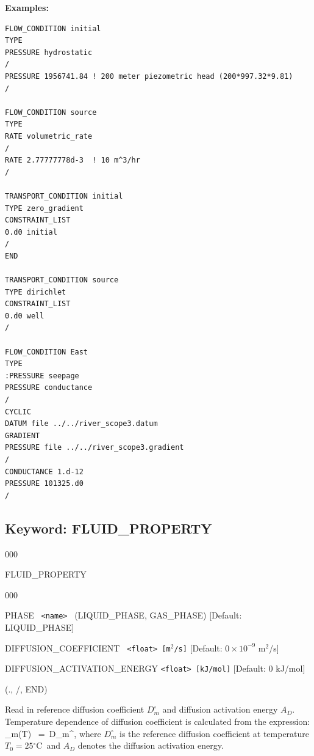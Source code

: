 \documentclass[12pt]{article}
\def\EQ#1\EN{\begin{equation}#1\end{equation}}
\newcommand{\degc}{$^\circ$C}
\newcommand{\eq}{\ =\ }
\begin{document}
\bigskip

{\noindent\bf Examples:}
\begin{verbatim}
FLOW_CONDITION initial
TYPE
PRESSURE hydrostatic
/
PRESSURE 1956741.84 ! 200 meter piezometric head (200*997.32*9.81)
/

FLOW_CONDITION source
TYPE
RATE volumetric_rate
/
RATE 2.77777778d-3  ! 10 m^3/hr
/

TRANSPORT_CONDITION initial
TYPE zero_gradient
CONSTRAINT_LIST
0.d0 initial
/
END

TRANSPORT_CONDITION source
TYPE dirichlet
CONSTRAINT_LIST
0.d0 well
/

FLOW_CONDITION East
TYPE
:PRESSURE seepage
PRESSURE conductance
/
CYCLIC
DATUM file ../../river_scope3.datum
GRADIENT
PRESSURE file ../../river_scope3.gradient
/
CONDUCTANCE 1.d-12
PRESSURE 101325.d0
/
\end{verbatim}


\newpage
\protect\hypertarget{target_fluid_property}{}

\subsection{Keyword: FLUID\_PROPERTY}


\begin{deflist}{000}
\item[FLUID\_PROPERTY]~
\begin{deflist}{000}
\item[PHASE] \ {\tt <name>} \ (LIQUID\_PHASE, GAS\_PHASE) [Default: LIQUID\_PHASE]
\item[DIFFUSION\_COEFFICIENT] \ {\tt <float> [m$^2$/s]} [Default: $0\times 10^{-9}$ m$^2$/s]
\item[DIFFUSION\_ACTIVATION\_ENERGY] {\tt <float> [kJ/mol]} [Default: 0 kJ/mol]
\end{deflist}
\item[(., /, END)]
\end{deflist}

 Read in reference diffusion coefficient $D_m^\circ$ and diffusion activation energy $A_D$. Temperature dependence of diffusion coefficient is calculated from the expression:
\EQ
D_m(T) \eq D_m^\circ\exp{},
\EN
where $D_m^\circ$ is the reference diffusion coefficient at temperature $T_0 = 25$\degc\ and $A_D$ denotes the diffusion activation energy.
\end{document}
